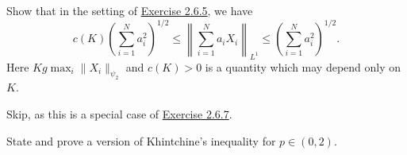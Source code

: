 \begin{problem*}[Exercise 2.6.6]\label{ex2.6.6}
	Show that in the setting of \hyperref[ex2.6.5]{Exercise 2.6.5}, we have
	\[
		c(K) \left( \sum_{i=1}^{N} a_i^2 \right) ^{1 / 2}
		\leq \left\lVert \sum_{i=1}^{N} a_i X_i \right\rVert _{L^1}
		\leq \left( \sum_{i=1}^{N} a_i^2 \right) ^{1 / 2}.
	\]
	Here \(K g \max _i \lVert X_i \rVert _{\psi _2}\) and \(c(K) > 0\) is a quantity which may depend only on \(K\).
\end{problem*}
\begin{answer}
	Skip, as this is a special case of \hyperref[ex2.6.7]{Exercise 2.6.7}.
\end{answer}

\begin{problem*}[Exercise 2.6.7]\label{ex2.6.7}
	State and prove a version of Khintchine's inequality for \(p \in (0, 2)\).
\end{problem*}
